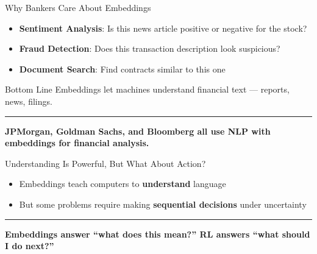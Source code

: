 \documentclass[8pt,aspectratio=169]{beamer}
\newcommand{\bottomnote}[1]{%
\vfill
\vspace{-2mm}
\textcolor{mllavender2}{\rule{\textwidth}{0.4pt}}
\vspace{1mm}
\footnotesize
\textbf{#1}
}
\newenvironment{compactlist}{%
  \begin{itemize}%
    \setlength{\itemsep}{2pt}%
    \setlength{\parskip}{0pt}%
    \setlength{\parsep}{0pt}%
}{%
  \end{itemize}%
}
\begin{document}
\begin{frame}{Why Bankers Care About Embeddings}
\begin{compactlist}
\item \textbf{Sentiment Analysis}: Is this news article positive or negative for the stock?
\item \textbf{Fraud Detection}: Does this transaction description look suspicious?
\item \textbf{Document Search}: Find contracts similar to this one
\end{compactlist}
\vspace{3mm}
\begin{block}{Bottom Line}
Embeddings let machines understand financial text --- reports, news, filings.
\end{block}
\bottomnote{JPMorgan, Goldman Sachs, and Bloomberg all use NLP with embeddings for financial analysis.}
\end{frame}

\begin{frame}{Understanding Is Powerful, But What About Action?}
\centering
{}

\vspace{2mm}
\begin{compactlist}
\item Embeddings teach computers to \textbf{understand} language
\item But some problems require making \textbf{sequential decisions} under uncertainty
\end{compactlist}
\bottomnote{Embeddings answer ``what does this mean?'' RL answers ``what should I do next?''}
\end{frame}
\end{document}
